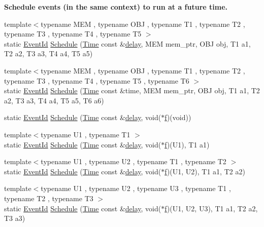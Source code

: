 \begin{Indent}{\bf Schedule events (in the same context) to run at a future time.}
\begin{DoxyCompactItemize}
\item 
{\footnotesize template$<$typename M\+EM , typename O\+BJ , typename T1 , typename T2 , typename T3 , typename T4 , typename T5 $>$ }\\static \hyperlink{classns3_1_1EventId}{Event\+Id} \hyperlink{classns3_1_1Simulator_ad376b0089947ab6568331b43587491ae}{Schedule} (\hyperlink{classns3_1_1Time}{Time} const \&\hyperlink{mmwave_2model_2fading-traces_2fading__trace__generator_8m_a7964e6aa8f61a9d28973c8267a606ad8}{delay}, M\+EM mem\+\_\+ptr, O\+BJ obj, T1 a1, T2 a2, T3 a3, T4 a4, T5 a5)
\item 
{\footnotesize template$<$typename M\+EM , typename O\+BJ , typename T1 , typename T2 , typename T3 , typename T4 , typename T5 , typename T6 $>$ }\\static \hyperlink{classns3_1_1EventId}{Event\+Id} \hyperlink{classns3_1_1Simulator_a0c3e94812cd389dcd58069edcc3d746d}{Schedule} (\hyperlink{classns3_1_1Time}{Time} const \&time, M\+EM mem\+\_\+ptr, O\+BJ obj, T1 a1, T2 a2, T3 a3, T4 a4, T5 a5, T6 a6)
\item 
static \hyperlink{classns3_1_1EventId}{Event\+Id} \hyperlink{classns3_1_1Simulator_aef3ed05e819e23c1ef283d332356a95c}{Schedule} (\hyperlink{classns3_1_1Time}{Time} const \&\hyperlink{mmwave_2model_2fading-traces_2fading__trace__generator_8m_a7964e6aa8f61a9d28973c8267a606ad8}{delay}, void($\ast$\hyperlink{80211b_8c_ae7ffc1a8f84fa47a0812b2f2b9627132}{f})(void))
\item 
{\footnotesize template$<$typename U1 , typename T1 $>$ }\\static \hyperlink{classns3_1_1EventId}{Event\+Id} \hyperlink{classns3_1_1Simulator_a967f0494b85b6b3d90c67c26c190d3af}{Schedule} (\hyperlink{classns3_1_1Time}{Time} const \&\hyperlink{mmwave_2model_2fading-traces_2fading__trace__generator_8m_a7964e6aa8f61a9d28973c8267a606ad8}{delay}, void($\ast$\hyperlink{80211b_8c_ae7ffc1a8f84fa47a0812b2f2b9627132}{f})(U1), T1 a1)
\item 
{\footnotesize template$<$typename U1 , typename U2 , typename T1 , typename T2 $>$ }\\static \hyperlink{classns3_1_1EventId}{Event\+Id} \hyperlink{classns3_1_1Simulator_ac3f8feacb8bb0d4a661150cb2c96ea6b}{Schedule} (\hyperlink{classns3_1_1Time}{Time} const \&\hyperlink{mmwave_2model_2fading-traces_2fading__trace__generator_8m_a7964e6aa8f61a9d28973c8267a606ad8}{delay}, void($\ast$\hyperlink{80211b_8c_ae7ffc1a8f84fa47a0812b2f2b9627132}{f})(U1, U2), T1 a1, T2 a2)
\item 
{\footnotesize template$<$typename U1 , typename U2 , typename U3 , typename T1 , typename T2 , typename T3 $>$ }\\static \hyperlink{classns3_1_1EventId}{Event\+Id} \hyperlink{classns3_1_1Simulator_a84c02f5536ba793f88abd0c1bc59429f}{Schedule} (\hyperlink{classns3_1_1Time}{Time} const \&\hyperlink{mmwave_2model_2fading-traces_2fading__trace__generator_8m_a7964e6aa8f61a9d28973c8267a606ad8}{delay}, void($\ast$\hyperlink{80211b_8c_ae7ffc1a8f84fa47a0812b2f2b9627132}{f})(U1, U2, U3), T1 a1, T2 a2, T3 a3)

\end{DoxyCompactItemize}
\end{Indent}
